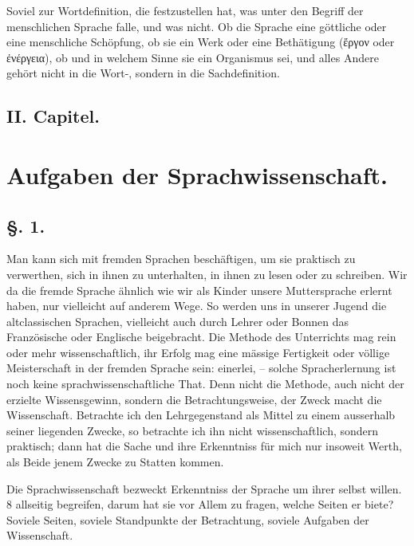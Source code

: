 Soviel zur Wortdefinition, die festzustellen hat, was unter den Begriff der menschlichen Sprache falle, und was nicht. Ob die Sprache eine göttliche oder eine menschliche Schöpfung, ob sie ein Werk oder eine Bethätigung (ἔργον oder ἐνέργεια), ob und in welchem Sinne sie ein Organismus sei, und alles Andere gehört nicht in die Wort-, sondern in die Sachdefinition.

\subsection*{II. Capitel.}
\section*{Aufgaben der Sprachwissenschaft.}
\subsection*{§. 1.}\label{I.II.1}

Man kann sich mit fremden Sprachen beschäftigen, um sie praktisch zu verwerthen, sich in ihnen zu unterhalten, in ihnen zu lesen oder zu schreiben. Wir  da die fremde Sprache ähnlich wie wir als Kinder unsere Muttersprache erlernt haben, nur vielleicht auf anderem Wege. So werden uns in unserer Jugend die altclassischen Sprachen, vielleicht auch durch Lehrer oder Bonnen das Französische oder Englische beigebracht. Die Methode des Unterrichts mag rein  oder mehr wissenschaftlich, ihr Erfolg mag eine mässige Fertigkeit oder völlige Meisterschaft in der fremden Sprache sein: einerlei, – solche Spracherlernung ist noch keine sprachwissenschaftliche That. Denn nicht die Methode, auch nicht der erzielte Wissensgewinn, sondern die Betrachtungsweise, der Zweck macht die Wissenschaft. Betrachte ich den Lehrgegenstand als Mittel zu einem ausserhalb seiner liegenden Zwecke, so \label{fp.9} betrachte ich ihn nicht wissenschaftlich, sondern praktisch; dann hat die Sache und ihre Erkenntniss für mich nur insoweit Werth, als Beide jenem Zwecke zu Statten kommen.

Die Sprachwissenschaft bezweckt Erkenntniss der Sprache um ihrer selbst willen.  {\textbar}{\textbar}8{\textbar}{\textbar}\label{sp.8}   allseitig begreifen, darum hat sie vor Allem zu fragen, welche Seiten er biete? Soviele Seiten, soviele Standpunkte der Betrachtung, soviele Aufgaben der Wissenschaft.

